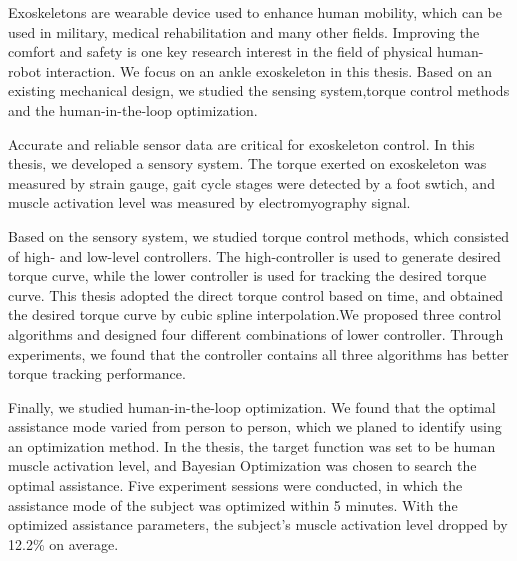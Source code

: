 \begin{abstractEn}
  Exoskeletons are wearable device used to enhance human mobility, which can be used in military, medical rehabilitation and many other fields. Improving the comfort and safety is one key research interest in the field of physical human-robot interaction. We focus on an ankle exoskeleton in this thesis. Based on an existing mechanical design, we studied the sensing system,torque control methods and the human-in-the-loop optimization.

  Accurate and reliable sensor data are critical for exoskeleton control. In this thesis, we developed a sensory system. The torque exerted on exoskeleton was measured by strain gauge, gait cycle stages were detected by a foot swtich, and muscle activation level was measured by electromyography signal.

  Based on the sensory system, we studied torque control methods, which consisted of high- and low-level controllers. The high-controller is used to generate desired torque curve, while the lower controller is used for tracking the desired torque curve. This thesis adopted the direct torque control based on time, and obtained the desired torque curve by cubic spline interpolation.We proposed three control algorithms and designed four different combinations of lower controller. Through experiments, we found that the controller contains all three algorithms has better torque tracking performance.

  Finally, we studied human-in-the-loop optimization. We found that the optimal assistance mode varied from person to person, which we planed to identify using an optimization method. In the thesis, the target function was set to be human muscle activation level, and Bayesian Optimization was chosen to search the optimal assistance. Five experiment sessions were conducted, in which the assistance mode of the subject was optimized within 5 minutes. With the optimized assistance parameters, the subject's muscle activation level dropped by 12.2\% on average.

\end{abstractEn}


\usepackage{subfig}
\usepackage{rotating}
\usepackage[usenames,dvipsnames]{xcolor}
\usepackage{tikz}
\usepackage{pgfplots}
\pgfplotsset{compat=1.16}
\usepackage{ifthen}
\usepackage{longtable}
\usepackage{siunitx}
\usepackage{listings}
\usepackage{multirow}
\usepackage[bottom]{footmisc}
\usepackage{pifont}

